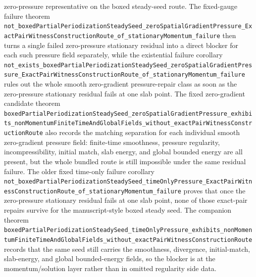 \documentclass[11pt]{article}
\theoremstyle{remark}
\begin{document}
zero-pressure representative on the boxed steady-seed route.  The fixed-gauge
failure theorem
\texttt{not\_boxedPartialPeriodizationSteadySeed\_zeroSpatialGradientPressure\_ExactPairWitnessConstructionRoute\_of\_stationaryMomentum\_failure}
then turns a single failed zero-pressure stationary residual into a direct
blocker for each such pressure field separately, while the existential failure
corollary
\texttt{not\_exists\_boxedPartialPeriodizationSteadySeed\_zeroSpatialGradientPressure\_ExactPairWitnessConstructionRoute\_of\_stationaryMomentum\_failure}
rules out the whole smooth zero-gradient pressure-repair class as soon as the
zero-pressure stationary residual fails at one slab point.  The fixed
zero-gradient candidate theorem
\texttt{boxedPartialPeriodizationSteadySeed\_zeroSpatialGradientPressure\_exhibits\_nonMomentumFiniteTimeAndGlobalFields\_without\_exactPairWitnessConstructionRoute}
also records the matching separation for each individual smooth zero-gradient
pressure field: finite-time smoothness, pressure regularity, incompressibility,
initial match, slab energy, and global bounded energy are all present, but the
whole bundled route is still impossible under the same residual failure.  The
older fixed time-only failure corollary
\texttt{not\_boxedPartialPeriodizationSteadySeed\_timeOnlyPressure\_ExactPairWitnessConstructionRoute\_of\_stationaryMomentum\_failure}
proves that once the zero-pressure stationary residual fails at one slab point,
none of those exact-pair repairs survive for the manuscript-style boxed steady
seed.  The companion theorem
\texttt{boxedPartialPeriodizationSteadySeed\_timeOnlyPressure\_exhibits\_nonMomentumFiniteTimeAndGlobalFields\_without\_exactPairWitnessConstructionRoute}
records that the same seed still carries the smoothness, divergence,
initial-match, slab-energy, and global bounded-energy fields, so the blocker is
at the momentum/solution layer rather than in omitted regularity side data.
\end{document}
